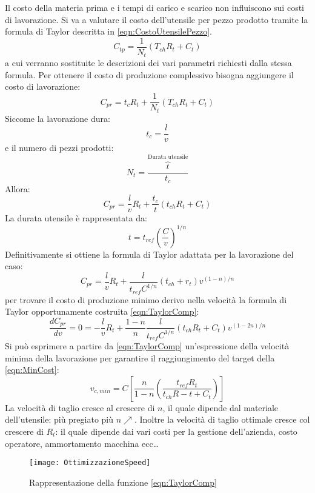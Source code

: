 Il costo della materia prima e i tempi di carico e scarico non influiscono sui costi di lavorazione.
Si va a valutare il costo dell'utensile per pezzo prodotto tramite la formula di Taylor descritta in \eqref{eqn:CostoUtensilePezzo}.
\begin{equation}
C_{tp} = \frac{1}{N_t} \left(T_{ch}R_t+C_t\right)
\label{eqn:CostoUtensilePezzo}
\end{equation}
a cui verranno sostituite le descrizioni dei vari parametri richiesti dalla stessa formula.
Per ottenere il costo di produzione complessivo bisogna aggiungere il costo di lavorazione:
\begin{equation}
C_{pr} = t_c R_t + \frac{1}{N_t} \left(T_{ch}R_t+C_t\right)
\end{equation}
Siccome la lavorazione dura:
\begin{equation}
t_c = \frac{l}{v}
\end{equation}
e il numero di pezzi prodotti:
\begin{equation}
N_t = \frac{\overbrace{t}^{\text{Durata utensile}}}{t_c}
\end{equation}
Allora:
\begin{equation}
C_{pr} = \frac{l}{v}R_t + \frac{t_c}{t}\left(t_{ch}R_t + C_t\right)
\end{equation}
La durata utensile è rappresentata da:
\begin{equation}
t = t_{ref}\left(\frac{C}{v}\right)^{1/n} \label{eqn:TUtensile}\end{equation}
Definitivamente si ottiene la formula di Taylor adattata per la lavorazione del caso:
\begin{equation}
C_{pr} = \frac{l}{v}R_t + \frac{l}{t_{ref}C^{1/n}}\left(t_{ch}+r_t\right)v^{\left(1-n\right)/n}\label{eqn:TaylorComp}
\end{equation}
per trovare il costo di produzione minimo derivo nella velocità la formula di Taylor opportunamente costruita \eqref{eqn:TaylorComp}:
\begin{equation}
\frac{dC_{pr}}{dv} = 0 = -\frac{l}{v}R_t + \frac{1-n}{n}\frac{l}{t_{ref}C^{1/n}} \left(t_{ch}R_t + C_t \right)v^{\left(1-2n\right)/n}
\label{eqn:MinCost}
\end{equation}
Si può esprimere a partire da \eqref{eqn:TaylorComp} un'espressione della velocità minima della lavorazione per garantire il raggiungimento del target della \eqref{eqn:MinCost}:
\begin{equation}
v_{c,min}  = C \left[\frac{n}{1-n}\left(\frac{t_{ref}R_t}{t_{ch}R-t + C_t}\right)\right]
\label{eqn:MinSpeed}
\end{equation}
La velocità di taglio cresce al crescere di $n$, il quale dipende dal materiale dell'utensile: più pregiato più $n\nearrow$. Inoltre la velocità di taglio ottimale cresce col crescere di $R_t$: il quale dipende dai vari costi per la gestione dell'azienda, costo operatore, ammortamento macchina ecc\dots

\begin{figure}
\centering
\texttt{[image: OttimizzazioneSpeed]}
\caption{Rappresentazione della funzione \eqref{eqn:TaylorComp}}
\label{fig:OttimSPeedCost}
\end{figure}

